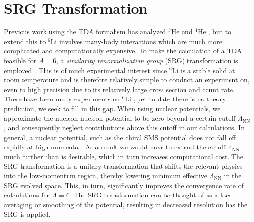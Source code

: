 \documentclass[12pt]{article}
\newcommand{\LamNN}{\Lambda_{\mathrm{NN}}}
\newcommand{\LiS}{{}^{6} \mathrm{Li} }
\newcommand{\HeF}{{}^{4} \mathrm{He}}
\newcommand{\HeT}{{}^{3} \mathrm{He}}
\newcommand{\3}{\ss}
\numberwithin{equation}{section}
\begin{document}
\section{SRG Transformation}
Previous work using the TDA formalism has analyzed
$\HeT$ and $\HeF$
\cite{hgrie3He, hgrie4He}
, but to extend this to $\LiS$ involves many-body
interactions which are much more complicated and computationally expensive.
To make the calculation of a TDA feasible for $A=6$, a
\textit{similarity renormalization group} (SRG) transformation
is employed \cite{SRG, Furnstahl2013}.
This is of much experimental interest since $\LiS$ is a stable solid at room temperature and is
therefore relatively simple to conduct an experiment on, even to high precision due to its relatively large
cross section and count rate.
There have been many experiments on $\LiS$ \cite{60MeV,86MeV}, yet to date there is no theory prediction,
we seek to fill in this gap.
When using nuclear potentials, we approximate the nucleon-nucleon potential to be zero
beyond a certain cutoff $\LamNN$, and consequently
neglect contributions above this cutoff in our calculations.
In general, a nuclear potential, such as the chiral SMS potential does
not fall off rapidly at high momenta \cite{Reinert2018}.
As a result we would have to
extend the cutoff $\LamNN$ much further than is desirable, which in turn
increases computational cost.
The SRG transformation is a unitary transformation that
shifts the relevant physics into the low-momentum
region, thereby lowering minimum effective $\LamNN$ in the SRG evolved space.
This, in turn, significantly improves the convergence rate of calculations for $A=6$.
The SRG transformation can be thought of as a local averaging or
smoothing of the potential, resulting in decreased resolution
has the SRG is applied.
\end{document}
